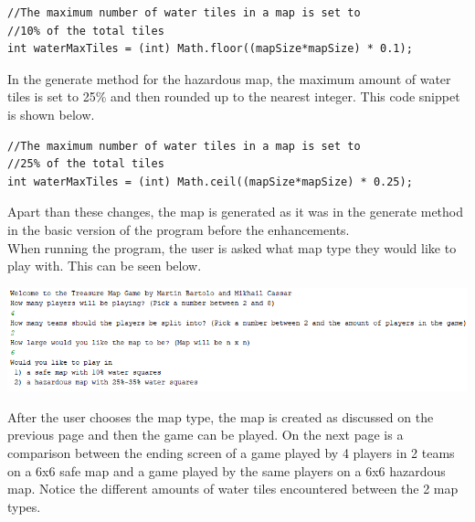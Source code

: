 \documentclass[a4paper,12pt]{extarticle}
\begin{document}
\begin{lstlisting}
//The maximum number of water tiles in a map is set to
//10% of the total tiles
int waterMaxTiles = (int) Math.floor((mapSize*mapSize) * 0.1);
\end{lstlisting}
\vspace{4mm}

\noindent In the generate method for the hazardous map, the maximum amount of water tiles is set to 25\% and then rounded up to the nearest integer. This code snippet is shown below.

\begin{lstlisting}
//The maximum number of water tiles in a map is set to 
//25% of the total tiles
int waterMaxTiles = (int) Math.ceil((mapSize*mapSize) * 0.25);
\end{lstlisting}
\vspace{4mm}

\noindent Apart than these changes, the map is generated as it was in the generate method in the basic version of the program before the enhancements.\\

\noindent When running the program, the user is asked what map type they would like to play with. This can be seen below.

\begin{center}
\includegraphics[width=\textwidth]{Figure1.png}
\end{center}

\noindent After the user chooses the map type, the map is created as discussed on the previous page and then the game can be played. On the next page is a comparison between the ending screen of a game played by 4 players in 2 teams on a 6x6 safe map and a game played by the same players on a 6x6 hazardous map. Notice the different amounts of water tiles encountered between the 2 map types.
\newpage
\end{document}
